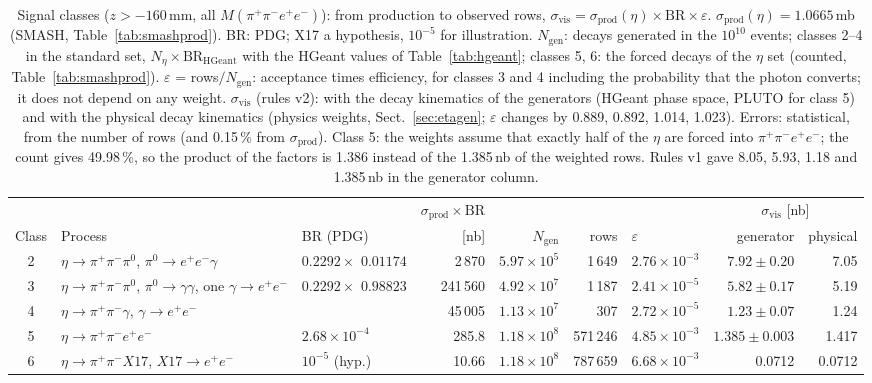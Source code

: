 \documentclass[11pt,a4paper]{article}
\newcommand{\piz}{\ensuremath{\pi^{0}}\xspace}
\newcommand{\ee}{\ensuremath{e^{+}e^{-}}\xspace}
\newcommand{\pipi}{\ensuremath{\pi^{+}\pi^{-}}\xspace}
\newcommand{\ppee}{\ensuremath{\pi^{+}\pi^{-}e^{+}e^{-}}\xspace}
\newcommand{\Mfour}{\ensuremath{M(\pi^{+}\pi^{-}e^{+}e^{-})}\xspace}
\begin{document}
\begin{table}[H]
\centering
\caption{Signal classes ($z>-160$\,mm, all $\Mfour$): from production to observed rows,
$\sigma_{\mathrm{vis}} = \sigma_{\mathrm{prod}}(\eta)\times\mathrm{BR}\times\varepsilon$.
$\sigma_{\mathrm{prod}}(\eta) = 1.0665$\,mb (SMASH, Table~\ref{tab:smashprod}).
BR: PDG; X17 a hypothesis, $10^{-5}$ for illustration.
$N_{\mathrm{gen}}$: decays generated in the $10^{10}$ events; classes 2--4 in the standard set,
$N_\eta\times\mathrm{BR}_{\mathrm{HGeant}}$ with the HGeant values of Table~\ref{tab:hgeant}; classes 5, 6:
the forced decays of the $\eta$ set (counted, Table~\ref{tab:smashprod}).
$\varepsilon$ = rows$/N_{\mathrm{gen}}$: acceptance times efficiency, for classes 3 and 4 including the
probability that the photon converts; it does not depend on any weight. $\sigma_{\mathrm{vis}}$ (rules
v2): with the decay kinematics of the generators (HGeant phase space, PLUTO for class 5) and with
the physical decay kinematics (physics weights, Sect.~\ref{sec:etagen}; $\varepsilon$ changes by
0.889, 0.892, 1.014, 1.023). Errors: statistical, from the number of rows (and 0.15\,\% from
$\sigma_{\mathrm{prod}}$). Class 5: the weights assume that exactly half of the $\eta$ are forced into
\ppee; the count gives 49.98\,\%, so the product of the factors is 1.386 instead of the 1.385\,nb of the
weighted rows. Rules v1 gave 8.05, 5.93, 1.18 and 1.385\,nb in the generator column.}
\label{tab:cls}
\footnotesize
\setlength{\tabcolsep}{3.5pt}
\begin{tabular}{@{}c >{\raggedright\arraybackslash}p{3.0cm} >{\raggedright\arraybackslash}p{1.55cm} r r r l r r@{}}
\toprule
 & & & $\sigma_{\mathrm{prod}}\times\mathrm{BR}$ & & & & \multicolumn{2}{c}{$\sigma_{\mathrm{vis}}$ [nb]} \\
Class & Process & BR (PDG) & [nb] & $N_{\mathrm{gen}}$ & rows & $\varepsilon$ & generator & physical \\
\midrule
2 & $\eta\to\pipi\piz$, $\piz\to\ee\gamma$ & $0.2292\times$ $0.01174$ & 2\,870 & $5.97\times10^{5}$ & 1\,649 & $2.76\times10^{-3}$ & $7.92\pm0.20$ & 7.05 \\
3 & $\eta\to\pipi\piz$, $\piz\to\gamma\gamma$, one $\gamma\to\ee$ & $0.2292\times$ $0.98823$ & 241\,560 & $4.92\times10^{7}$ & 1\,187 & $2.41\times10^{-5}$ & $5.82\pm0.17$ & 5.19 \\
4 & $\eta\to\pipi\gamma$, $\gamma\to\ee$ & 0.0422 & 45\,005 & $1.13\times10^{7}$ & 307 & $2.72\times10^{-5}$ & $1.23\pm0.07$ & 1.24 \\
5 & $\eta\to\ppee$ & $2.68\times10^{-4}$ & 285.8 & $1.18\times10^{8}$ & 571\,246 & $4.85\times10^{-3}$ & $1.385\pm0.003$ & 1.417 \\
6 & $\eta\to\pipi X17$, $X17\to\ee$ & $10^{-5}$ (hyp.) & 10.66 & $1.18\times10^{8}$ & 787\,659 & $6.68\times10^{-3}$ & 0.0712 & 0.0712 \\
\bottomrule
\end{tabular}
\end{table}
\end{document}
